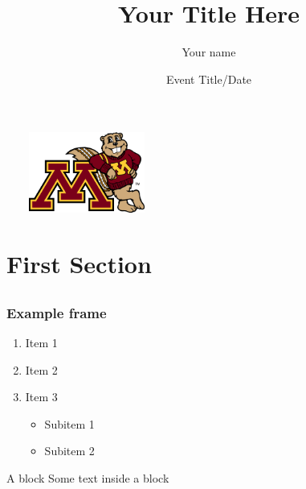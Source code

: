 \documentclass[11pt,xcolor=dvipsnames]{beamer}
\title[Short Title]{Your Title Here}
\author[Your name]{Your name}
\institute{Division of Biostatistics\\ University of Minnesota}
\date[Event]{Event Title/Date}
\begin{document}
\begin{frame}
\titlepage

\ \ \ \ \includegraphics[width=1.5in]{graphics/goldylean.png} %
\end{frame}


\section[First Section]{First Section}
\subsection{}

\begin{frame}
\frametitle{Example frame}

\begin{enumerate}
\item Item 1
\item Item 2
\item Item 3
\begin{itemize}
\item Subitem 1
\item Subitem 2
\end{itemize}
\end{enumerate}

\pause

\begin{block}{A block}
Some text inside a block
\end{block}

\end{frame}
\end{document}
